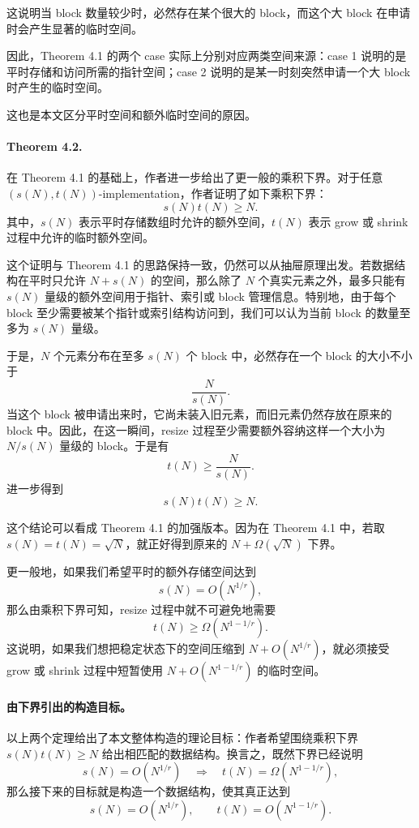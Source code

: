 \documentclass[12pt,a4paper]{article}
\begin{document}
这说明当 block 数量较少时，必然存在某个很大的 block，而这个大 block 在申请时会产生显著的临时空间。

因此，Theorem 4.1 的两个 case 实际上分别对应两类空间来源：case 1 说明的是平时存储和访问所需的指针空间；case 2 说明的是某一时刻突然申请一个大 block 时产生的临时空间。

这也是本文区分平时空间和额外临时空间的原因。

\paragraph{Theorem 4.2.}

在 Theorem 4.1 的基础上，作者进一步给出了更一般的乘积下界。对于任意 $(s(N),t(N))$-implementation，作者证明了如下乘积下界\cite{tarjan2023optimalresizablearrays}：
\[
s(N)t(N)\ge N.
\]
其中，$s(N)$ 表示平时存储数组时允许的额外空间，$t(N)$ 表示 grow 或 shrink 过程中允许的临时额外空间。

这个证明与 Theorem 4.1 的思路保持一致，仍然可以从抽屉原理出发。若数据结构在平时只允许 $N+s(N)$ 的空间，那么除了 $N$ 个真实元素之外，最多只能有 $s(N)$ 量级的额外空间用于指针、索引或 block 管理信息。特别地，由于每个 block 至少需要被某个指针或索引结构访问到，我们可以认为当前 block 的数量至多为 $s(N)$ 量级。

于是，$N$ 个元素分布在至多 $s(N)$ 个 block 中，必然存在一个 block 的大小不小于
\[
\frac{N}{s(N)}.
\]
当这个 block 被申请出来时，它尚未装入旧元素，而旧元素仍然存放在原来的 block 中。因此，在这一瞬间，resize 过程至少需要额外容纳这样一个大小为 $N/s(N)$ 量级的 block。于是有
\[
t(N)\ge \frac{N}{s(N)}.
\]
进一步得到
\[
s(N)t(N)\ge N.
\]

这个结论可以看成 Theorem 4.1 的加强版本。因为在 Theorem 4.1 中，若取 $s(N)=t(N)=\sqrt{N}$，就正好得到原来的 $N+\Omega(\sqrt{N})$ 下界。

更一般地，如果我们希望平时的额外存储空间达到
\[
s(N)=O(N^{1/r}),
\]
那么由乘积下界可知，resize 过程中就不可避免地需要
\[
t(N)\ge \Omega(N^{1-1/r}).
\]
这说明，如果我们想把稳定状态下的空间压缩到 $N+O(N^{1/r})$，就必须接受 grow 或 shrink 过程中短暂使用 $N+O(N^{1-1/r})$ 的临时空间。

\paragraph{由下界引出的构造目标。}

以上两个定理给出了本文整体构造的理论目标：作者希望围绕乘积下界 $s(N)t(N)\ge N$ 给出相匹配的数据结构。换言之，既然下界已经说明
\[
s(N)=O(N^{1/r})
\quad \Longrightarrow \quad
t(N)=\Omega(N^{1-1/r}),
\]
那么接下来的目标就是构造一个数据结构，使其真正达到
\[
s(N)=O(N^{1/r}),\qquad t(N)=O(N^{1-1/r}).
\]
\end{document}
